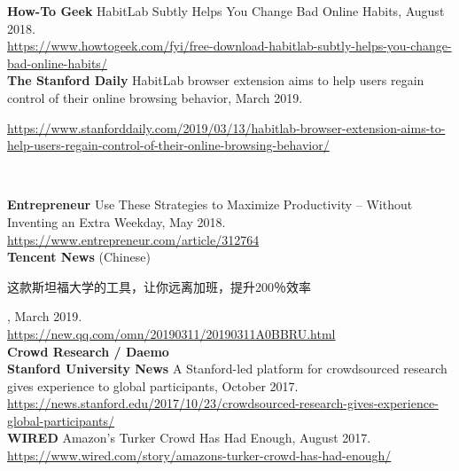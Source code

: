 \documentclass[10pt,A4]{article}
\begin{document}
\textbf{How-To Geek} HabitLab Subtly Helps You Change Bad Online Habits, August 2018.\\
\url{https://www.howtogeek.com/fyi/free-download-habitlab-subtly-helps-you-change-bad-online-habits/}\\

\textbf{The Stanford Daily} HabitLab browser extension aims to help users regain control of their online browsing behavior, March 2019.\\
\begin{footnotesize}
\url{https://www.stanforddaily.com/2019/03/13/habitlab-browser-extension-aims-to-help-users-regain-control-of-their-online-browsing-behavior/}
\end{footnotesize}\\

\vspace{-4mm}

\textbf{Entrepreneur} Use These Strategies to Maximize Productivity -- Without Inventing an Extra Weekday, May 2018.\\
\url{https://www.entrepreneur.com/article/312764}\\



\textbf{Tencent News} (Chinese) \begin{CJK*}{UTF8}{gbsn}这款斯坦福大学的工具，让你远离加班，提升200％效率\end{CJK*}, March 2019.\\
\url{https://new.qq.com/omn/20190311/20190311A0BBRU.html}\\


\textcolor{sectcol}{\textbf{Crowd Research / Daemo}}\\

\textbf{Stanford University News} A Stanford-led platform for crowdsourced research gives experience to global participants, October 2017.\\
\url{https://news.stanford.edu/2017/10/23/crowdsourced-research-gives-experience-global-participants/}\\

\textbf{WIRED} Amazon's Turker Crowd Has Had Enough, August 2017.\\
\url{https://www.wired.com/story/amazons-turker-crowd-has-had-enough/}\\
\end{document}

